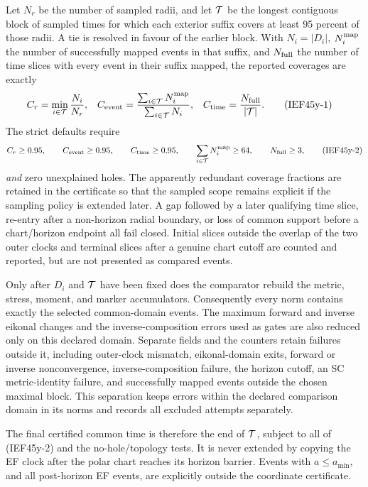 Let \(N_r\) be the number of sampled radii, and let \({\cal T}\) be the
longest contiguous block of sampled times for which each exterior suffix
covers at least 95 percent of those radii.  A tie is resolved in favour of
the earlier block.  With \(N_i=|D_i|\), \(N_i^{\rm map}\) the number of
successfully mapped events in that suffix, and \(N_{\rm full}\) the number
of time slices with every event in their suffix mapped, the reported
coverages are exactly
\begin{align}
 C_r&=\min_{i\in{\cal T}}\frac{N_i}{N_r},&
 C_{\rm event}&=
  \frac{\sum_{i\in{\cal T}}N_i^{\rm map}}
       {\sum_{i\in{\cal T}}N_i},&
 C_{\rm time}&=\frac{N_{\rm full}}{|{\cal T}|}.       \tag{IEF45y-1}
\end{align}
The strict defaults require
\[
 C_r\ge0.95,\qquad C_{\rm event}\ge0.95,\qquad
 C_{\rm time}\ge0.95,\qquad
 \sum_{i\in{\cal T}}N_i^{\rm map}\ge64,\qquad
 N_{\rm full}\ge3,                                   \tag{IEF45y-2}
\]
\emph{and} zero unexplained holes.  The apparently redundant coverage
fractions are retained in the certificate so that the sampled scope remains
explicit if the sampling policy is extended later.  A gap followed by a
later qualifying time slice, re-entry after a non-horizon radial boundary, or
loss of common support before a chart/horizon endpoint all fail closed.
Initial slices outside the overlap of the two outer clocks and terminal slices
after a genuine chart cutoff are counted and reported, but are not presented
as compared events.

Only after \(D_i\) and \({\cal T}\) have been fixed does the comparator rebuild
the metric, stress, moment, and marker accumulators.  Consequently every norm
contains exactly the selected common-domain events.  The maximum forward and
inverse eikonal changes and the inverse-composition errors used as gates are
also reduced only on this declared domain.  Separate
 fields and the  counters retain
failures outside it, including outer-clock mismatch, eikonal-domain exits,
forward or inverse nonconvergence, inverse-composition failure, the horizon
cutoff, an SC metric-identity failure, and successfully mapped events outside
the chosen maximal block.  This separation keeps errors within the declared comparison domain in its
norms and records all excluded attempts separately.

The final certified common time is therefore the end of \({\cal T}\), subject
to all of (IEF45y-2) and the no-hole/topology tests.  It is never extended by
copying the EF clock after the polar chart reaches its horizon barrier.
Events with \(a\le a_{\min}\), and all post-horizon EF events, are explicitly
outside the coordinate certificate.

